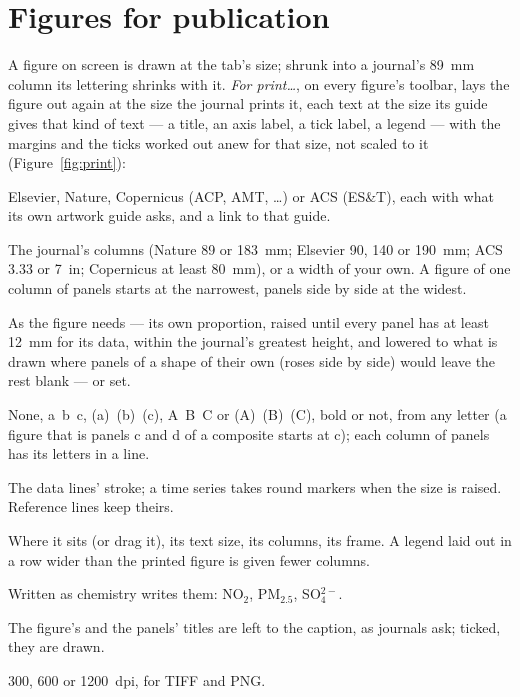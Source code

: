 \documentclass[11pt]{report}
\newcommand{\nosep}{\setlength{\itemsep}{0pt}\setlength{\parskip}{0pt}\setlength{\topsep}{2pt}}
\begin{document}
\section{Figures for publication}\label{sec:print}
A figure on screen is drawn at the tab's size; shrunk into a journal's 89~mm column its
lettering shrinks with it. \emph{For print\ldots}, on every figure's toolbar, lays the
figure out again at the size the journal prints it, each text at the size its guide gives
that kind of text --- a title, an axis label, a tick label, a legend --- with the margins
and the ticks worked out anew for that size, not scaled to it (Figure~\ref{fig:print}):
\begin{description}\nosep
  \item[Journal] Elsevier, Nature, Copernicus (ACP, AMT, \ldots) or ACS (ES\&T), each with
        what its own artwork guide asks, and a link to that guide.
  \item[Width] The journal's columns (Nature 89 or 183~mm; Elsevier 90, 140 or 190~mm;
        ACS 3.33 or 7~in; Copernicus at least 80~mm), or a width of your own. A figure of
        one column of panels starts at the narrowest, panels side by side at the widest.
  \item[Height] As the figure needs --- its own proportion, raised until every panel has
        at least 12~mm for its data, within the journal's greatest height, and lowered to
        what is drawn where panels of a shape of their own (roses side by side) would
        leave the rest blank --- or set.
  \item[Panel labels] None, a~b~c, (a)~(b)~(c), A~B~C or (A)~(B)~(C), bold or not, from any
        letter (a figure that is panels c and d of a composite starts at c); each column of
        panels has its letters in a line.
  \item[Line width, Marker size] The data lines' stroke; a time series takes round
        markers when the size is raised. Reference lines keep theirs.
  \item[Legend] Where it sits (or drag it), its text size, its columns, its frame. A legend
        laid out in a row wider than the printed figure is given fewer columns.
  \item[Formulas] Written as chemistry writes them: NO$_2$, PM$_{2.5}$, SO$_4^{2-}$.
  \item[Titles] The figure's and the panels' titles are left to the caption, as journals
        ask; ticked, they are drawn.
  \item[Raster resolution] 300, 600 or 1200~dpi, for TIFF and PNG.
\end{description}
\end{document}
